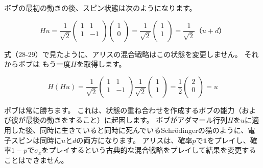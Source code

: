 ボブの最初の動きの後、スピン状態は次のようになります。

\begin{equation}
\label{33}
Hu = \frac{1}{\sqrt{2}}
\begin{pmatrix}
1 & 1 \\
1 & -1 \\
\end{pmatrix}
\begin{pmatrix}
1  \\
0  \\
\end{pmatrix}
=
\frac{1}{\sqrt{2}}
\begin{pmatrix}
1  \\
1  \\
\end{pmatrix}
=
\frac{1}{\sqrt{2}}（u+d）
\end{equation}

式（28-29）で見たように、アリスの混合戦略はこの状態を変更しません。 それからボブは
もう一度$H$を取得します。


\begin{equation}
\label{33}
H(Hu) = \frac{1}{\sqrt{2}}
\begin{pmatrix}
1 & 1 \\
1 & -1 \\
\end{pmatrix}
\frac{1}{\sqrt{2}}
\begin{pmatrix}
1  \\
1  \\
\end{pmatrix}
=
\frac{1}{2}
\begin{pmatrix}
2  \\
0  \\
\end{pmatrix}
= u
\end{equation}

ボブは常に勝ちます。 これは、状態の重ね合わせを作成するボブの能力（および彼が最後の動きをすること）に起因します。
ボブがアダマール行列$H$を$u$に適用した後、同時に生きていると同時に死んでいるSchrödingerの猫のように、電子スピンは同時に$u$と$d$の両方になります。 アリスは、確率$p$で$\textbf{1}$をプレイし、確率$1-p$で$\sigma_x$をプレイするという古典的な混合戦略をプレイして結果を変更することはできません。


